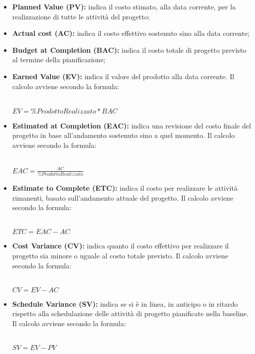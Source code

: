 \begin{itemize}
	\item \textbf{Planned Value (PV):} indica il costo stimato, alla data corrente, per la realizzazione di tutte le attività del progetto;
	\item \textbf{Actual cost (AC):} indica il costo effettivo sostenuto sino alla data corrente;
	\item \textbf{Budget at Completion (BAC):} indica il costo totale di progetto previsto al termine della pianificazione;
	\item \textbf{Earned Value (EV):} indica il valore del prodotto alla data corrente. Il calcolo avviene secondo la formula:\\\\
	\centerline{
		\begin{math}
		EV=\% ProdottoRealizzato*BAC
		\end{math}
	}
	\item \textbf{Estimated at Completion (EAC):} indica una revisione del costo finale del progetto in base all'andamento sostenuto sino a quel momento. Il calcolo avviene secondo la formula:\\\\
	\centerline{
		\begin{math}
		EAC=\frac{AC}{\% ProdottoRealizzato}
		\end{math}
	}
	\item \textbf{Estimate to Complete (ETC):} indica il costo per realizzare le attività rimanenti, basato sull'andamento attuale del progetto. Il calcolo avviene secondo la formula:\\\\
	\centerline{
		\begin{math}
		ETC=EAC-AC
		\end{math}
	}
	\item \textbf{Cost Variance	(CV):} indica quanto il costo effettivo per realizzare il progetto sia minore o uguale al costo totale previsto. Il calcolo avviene secondo la formula:\\\\
	\centerline{
		\begin{math}
		CV=EV-AC
		\end{math}
	}
	\item \textbf{Schedule Variance	(SV):} indica se si è in linea, in anticipo o in ritardo rispetto alla schedulazione delle attività di progetto pianificate nella baseline. Il calcolo avviene secondo la formula:\\\\
	\centerline{
		\begin{math}
		SV=EV-PV
		\end{math}
	}
\end{itemize}
